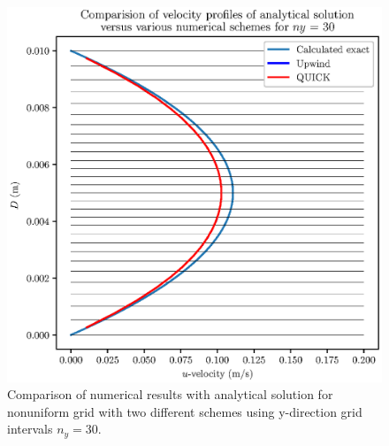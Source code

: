 \documentclass[12pt,a4paper,fleqn]{article}
\begin{document}
\begin{figure}[H]
    \centering
    \includegraphics[width=\textwidth]{ny-30_profilesComparison.eps}
    \caption{Comparison of numerical results with analytical solution for nonuniform grid with two different schemes using y-direction grid intervals \(n_y = 30\).}
    \label{fig:ny-30_profilesComparison.eps}
\end{figure}
\newpage
\end{document}
